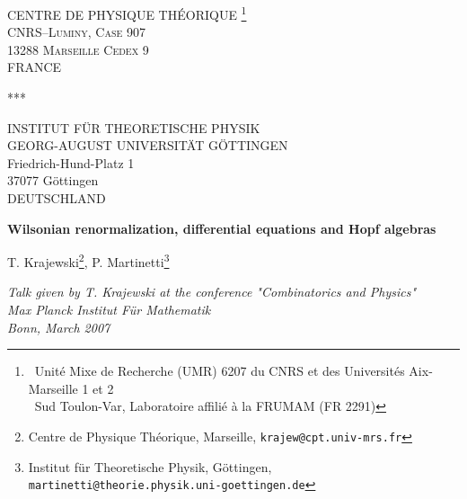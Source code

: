 \documentclass[10pt,here,feynmf]{article}
\begin{document}
\begin{center}
%
\scshape
CENTRE DE PHYSIQUE TH\'EORIQUE \footnote{\, Unit\'e Mixe de
Recherche (UMR) 6207 du CNRS et des Universit\'es Aix-Marseille 1 et 2 \\ \indent \quad \, Sud Toulon-Var, Laboratoire affili\'e \`a la 
FRUMAM (FR 2291)} \\ CNRS--Luminy, Case 907\\ 13288 Marseille Cedex 9\\
FRANCE\\
%
\bigskip
\centerline{***}
\bigskip
INSTITUT F\"UR THEORETISCHE PHYSIK\\
GEORG-AUGUST UNIVERSIT\"AT G\"OTTINGEN\\
Friedrich-Hund-Platz 1\\
37077 G\"ottingen\\
DEUTSCHLAND



\end{center}
\vspace{1cm}
\begin{center}
%
{\huge\bfseries Wilsonian renormalization, differential equations and Hopf algebras}
%
\end{center}

\vspace{1cm}


\begin{center}

{\Large T. Krajewski}\footnote{Centre de Physique Th\'eorique, Marseille, {\tt krajew@cpt.univ-mrs.fr}}, 
\quad
{\Large P. Martinetti}\footnote{Institut f\"ur Theoretische Physik, G\"ottingen, {\tt martinetti@theorie.physik.uni-goettingen.de}}  
\vspace{1cm}


\end{center}


\begin{center}
{\it \large Talk given by T. Krajewski at the conference "Combinatorics and Physics"}\\
\vspace{0.5cm}
{\it \large Max Planck Institut F\"ur Mathematik}\\
\vspace{0.5cm}
{\it \large Bonn, March 2007}\\
\end{center}
\vspace{1cm}


\end{document}
